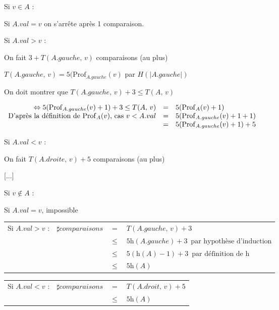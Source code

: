 Si $v \in A$ : \begin{minipage}[t]{\textwidth}

	Si $A.val = v$ on s'arrête après \textcolor{ocre}{1 comparaison}.
	
	Si $A.val > v$ : \begin{minipage}[t]{\textwidth}
		On fait \textcolor{ocre}{$ 3 + T(A.gauche,\, v) $ comparaisons (au plus)}
	
		$T(A.gauche,\, v) = 5 ( \mathrm{Prof}_{A.gauche}(v)$ par $H(\vert A.gauche \vert)$
		
		On doit montrer que $T(A.gauche,\, v) + 3 \leq T(A,\, v)$
		
		$\begin{array}{r c l}
			\Leftrightarrow 5 (\mathrm{Prof}_{A.gauche}(v) + 1) + 3 \leq T(A,\, v) & = & 5 (\mathrm{Prof}_{A}(v) + 1) \\
			\text{D'après la définition de } \mathrm{Prof}_{A}(v)\text{, cas } v < A.val & = & 5 (\mathrm{Prof}_{A.gauche}(v) + 1 + 1) \\
																				& = & 5 (\mathrm{Prof}_{A.gauche}(v) + 1) + 5
		\end{array}$
	\end{minipage}
	
	Si $A.val < v$ : \begin{minipage}[t]{\textwidth}
		On fait \textcolor{ocre}{$T(A.droite,\, v) + 5 $ comparaisons (au plus)}
		
		[...]
	\end{minipage}
\end{minipage}

Si $v \notin A$ : \begin{minipage}[t]{\textwidth}

	Si $A.val = v$, \textcolor{orange!90}{impossible}
	
	
	\begin{tabular}{c r c l}
	Si $A.val > v$ : & $\sharp comparaisons$ & $=$ & $T(A.gauche,\, v) + 3$ \\
					&  & $\leq$ & $5 \mathrm{h}(A.gauche) + 3 \,\text{ par hypothèse d'induction}$ \\
					&  & $\leq$ & $5 (\mathrm{h}(A) - 1) + 3 \,\text{ par définition de } \mathrm{h}$ \\
					&  & $\leq$ & $5 \mathrm{h}(A)$
		
	\end{tabular}
	
	\begin{tabular}{c r c l}
	Si $A.val < v$ : & $\sharp comparaisons$ & $=$ & $T(A.droit,\, v) + 5$ \\
					&  & $\leq$ & $5 \mathrm{h}(A)$
	\end{tabular}

\end{minipage}

